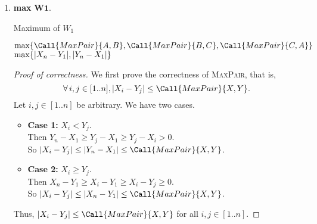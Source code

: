 \documentclass[12pt]{article}
\begin{document}
\begin{solution}
\begin{enumerate}[wide]
\begin{proof}[Proof of correctness]
                Thus, we have for any $i, j, k \in [1..n]$ that \[
                    w' \leq \max(\abs{A_{i} - B_{j}}, \abs{B_{j} - C_{k}}, \abs{C_{k} - A_{i}}).
                \] Since $w$ is always assigned a value of the form
                $\max(\abs{A_{i} - B_{j}}, \abs{B_{j} - C_{k}}, \abs{C_{k} - A_{i}})$,
                we have that \[
                    w' = \min\set{\max(\abs{A_{i} - B_{j}}, \abs{B_{j} - C_{k}}, \abs{C_{k} - A_{i}}) \mid i, j, k \in [1..n]}.
                \] Thus the value returned by the function on line 13 is correct.
            \end{proof}
        \item \textbf{max} $\bm{W1}$.
            \begin{algorithm}[H]
                \caption{Maximum of $W_1$}
                \begin{algorithmic}[1]
                        \State \Return $\max\set{\Call{MaxPair}{A, B}, \Call{MaxPair}{B, C}, \Call{MaxPair}{C, A}}$
                    \EndFunction
                        \State \Return $\max\set{\abs{X_{n} - Y_{1}}, \abs{Y_{n} - X_{1}}}$
                    \EndFunction
                \end{algorithmic}
            \end{algorithm}
            \begin{proof}[Proof of correctness]
                We first prove the correctness of \textsc{MaxPair}, that is, \[
                    \forall i, j \in [1..n], \abs{X_{i} - Y_{j}} \leq \Call{MaxPair}{X, Y}.
                \] Let $i, j \in [1..n]$ be arbitrary.
                We have two cases.
                \begin{itemize}
                    \item \textbf{Case 1:} $X_{i} < Y_{j}$. \\
                        Then $Y_{n} - X_{1} \geq Y_{j} - X_{1} \geq Y_{j} - X_{i} > 0$. \\
                        So $\abs{X_{i} - Y_{j}} \leq \abs{Y_{n} - X_{1}} \leq \Call{MaxPair}{X, Y}$.
                    \item \textbf{Case 2:} $X_{i} \geq Y_{j}$. \\
                        Then $X_{n} - Y_{1} \geq X_{i} - Y_{1} \geq X_{i} - Y_{j} \geq 0$. \\
                        So $\abs{X_{i} - Y_{j}} \leq \abs{X_{n} - Y_{1}} \leq \Call{MaxPair}{X, Y}$.
                \end{itemize}
                Thus, $\abs{X_{i} - Y_{j}} \leq \Call{MaxPair}{X, Y}$ for all $i, j \in [1..n]$.


\end{proof}
\end{enumerate}
\end{solution}
\end{document}
